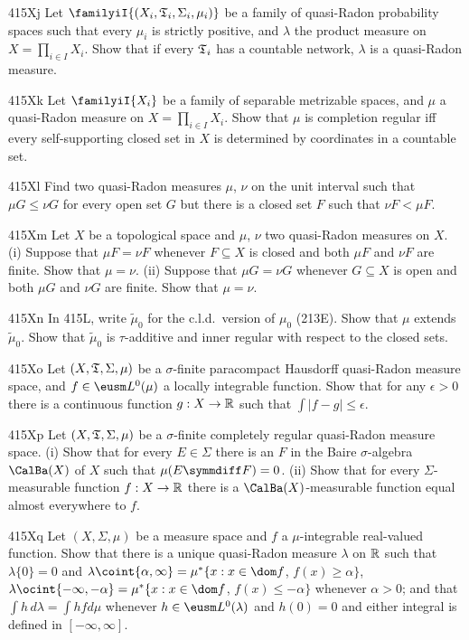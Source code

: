 {\spheader 415Xj Let $\familyiI{(X_i,\frak T_i,\Sigma_i,\mu_i)}$
be a family of quasi-Radon probability spaces such
that every $\mu_i$ is strictly positive, and $\lambda$ the product
measure on $X=\prod_{i\in I}X_i$.   Show that if every $\frak T_i$ has a
countable network, $\lambda$ is a quasi-Radon measure.

\spheader 415Xk Let $\familyiI{X_i}$ be a family of separable metrizable
spaces, and $\mu$ a quasi-Radon measure on $X=\prod_{i\in I}X_i$.   Show
that $\mu$ is completion regular iff every self-supporting closed set in
$X$ is determined by coordinates in a countable set.  

\spheader 415Xl Find two quasi-Radon measures $\mu$, $\nu$ on the unit
interval such that $\mu G\le\nu G$ for every open set $G$ but there is a
closed set $F$ such that $\nu F<\mu F$.

\spheader 415Xm Let $X$ be a topological space and $\mu$, $\nu$ two
quasi-Radon measures on $X$.   (i) Suppose that $\mu F=\nu F$ whenever
$F\subseteq X$ is closed and both $\mu F$ and $\nu F$ are finite.   Show
that $\mu=\nu$.
(ii) Suppose that $\mu G=\nu G$ whenever $G\subseteq X$ is open and both
$\mu G$ and $\nu G$ are finite.   Show that $\mu=\nu$.

\spheader 415Xn In 415L, write $\tilde\mu_0$ for the c.l.d.\ version of
$\mu_0$ (213E).   Show that $\mu$ extends $\tilde\mu_0$.   Show that
$\tilde\mu_0$ is $\tau$-additive and inner regular with respect to the
closed sets.

\spheader 415Xo Let $(X,\frak T,\Sigma,\mu)$ be a $\sigma$-finite
paracompact Hausdorff quasi-Radon measure space, and
$f\in\eusm L^0(\mu)$ a locally integrable function.   Show that for any
$\epsilon>0$ there is a continuous function $g:X\to\Bbb R$ such that
$\int|f-g|\le\epsilon$.

\sqheader 415Xp Let $(X,\frak T,\Sigma,\mu)$ be a $\sigma$-finite
completely regular quasi-Radon measure space.   (i) Show that for every
$E\in\Sigma$ there is an $F$ in the Baire $\sigma$-algebra $\CalBa(X)$ of $X$ such that $\mu(E\symmdiff F)=0$.      (ii) Show that for every $\Sigma$-measurable
function $f:X\to\Bbb R$ there is a $\CalBa(X)$-measurable function equal
almost everywhere to $f$.

\spheader 415Xq Let $(X,\Sigma,\mu)$ be a measure space and $f$ a
$\mu$-integrable real-valued function.   Show that there is a unique
quasi-Radon measure $\lambda$ on $\Bbb R$ such that $\lambda\{0\}=0$ and
$\lambda\coint{\alpha,\infty}=\mu^*\{x:x\in\dom f$, $f(x)\ge\alpha\}$,
$\lambda\ocint{-\infty,-\alpha}=\mu^*\{x:x\in\dom f$, $f(x)\le-\alpha\}$
whenever $\alpha>0$;  and that $\int h\,d\lambda=\int hfd\mu$ whenever
$h\in\eusm L^0(\lambda)$ and $h(0)=0$ and either integral is defined in
$[-\infty,\infty]$.   

}
